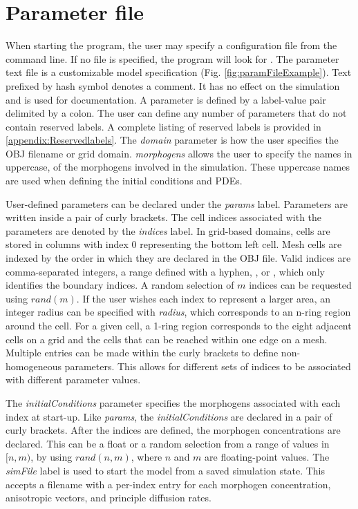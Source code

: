 \section{Parameter file}
When starting the program, the user may specify a configuration file from the command line. If no file is specified, the program will look for . The parameter text file is a customizable model specification (Fig. \ref{fig:paramFileExample}). Text prefixed by hash symbol denotes a comment. It has no effect on the simulation and is used for documentation. A parameter is defined by a label-value pair delimited by a colon. The user can define any number of parameters that do not contain reserved labels. A complete listing of reserved labels is provided in \ref{appendix:Reservedlabels}. The \textit{domain} parameter is how the user specifies the OBJ filename or grid domain. \textit{morphogens} allows the user to specify the names in uppercase, of the morphogens involved in the simulation. These uppercase names are used when defining the initial conditions and PDEs.

User-defined parameters can be declared under the \textit{params} label. Parameters are written inside a pair of curly brackets. The cell indices associated with the parameters are denoted by the \textit{indices} label. In grid-based domains, cells are stored in columns with index 0 representing the bottom left cell. Mesh cells are indexed by the order in which they are declared in the OBJ file. Valid indices are comma-separated integers, a range defined with a hyphen, , or , which only identifies the boundary indices. A random selection of $m$ indices can be requested using $rand(m)$. If the user wishes each index to represent a larger area, an integer radius can be specified with \textit{radius}, which corresponds to an n-ring region around the cell. For a given cell, a 1-ring region corresponds to the eight adjacent cells on a grid and the cells that can be reached within one edge on a mesh. Multiple entries can be made within the curly brackets to define non-homogeneous parameters. This allows for different sets of indices to be associated with different parameter values.

The \textit{initialConditions} parameter specifies the morphogens associated with each index at start-up. Like \textit{params}, the \textit{initialConditions} are declared in a pair of curly brackets. After the indices are defined, the morphogen concentrations are declared. This can be a float or a random selection from a range of values in $[n, m)$, by using $rand(n, m)$, where $n$ and $m$ are floating-point values. The \textit{simFile} label is used to start the model from a saved simulation state. This accepts a filename with a per-index entry for each morphogen concentration, anisotropic vectors, and principle diffusion rates.

